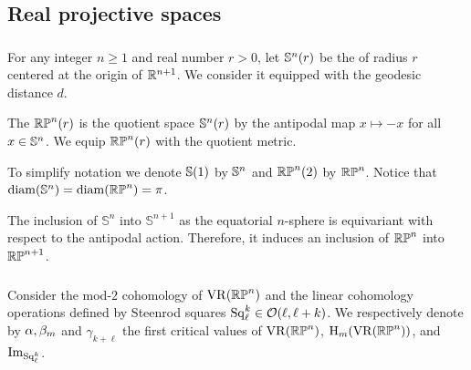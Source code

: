 
\subsection{Real projective spaces} \label{sub:first_critical_value_rpn}

\subsubsection{}

For any integer $n \geq 1$ and real number $r > 0$, let $\mathbb{S}^n(r)$ be the  of radius $r$ centered at the origin of $\mathbb{R}^{n+1}$.
We consider it equipped with the geodesic distance $d$.

The  $\mathbb{RP}^n(r)$ is the quotient space $\mathbb{S}^n(r)$ by the antipodal map $x \mapsto -x$ for all $x \in \mathbb{S}^n$.
We equip $\mathbb{RP}^n(r)$ with the quotient metric.

To simplify notation we denote $\mathbb{S}(1)$ by $\mathbb{S}^n$ and $\mathbb{RP}^n(2)$ by $\mathbb{RP}^n$.
Notice that $\operatorname{diam}(\mathbb{S}^n) = \operatorname{diam}(\mathbb{RP}^n) = \pi$.

The inclusion of \(\mathbb{S}^n\) into \(\mathbb{S}^{n+1}\) as the equatorial $n$-sphere is equivariant with respect to the antipodal action.
Therefore, it induces an inclusion of \(\mathbb{RP}^n\) into \(\mathbb{RP}^{n+1}\).


\subsubsection{}\label{sub:barcode_rpn}

Consider the mod-\(2\) cohomology of \(\operatorname{VR}(\mathbb{RP}^n)\) and the linear cohomology operations defined by Steenrod squares \(\operatorname{Sq}^k_\ell \in \mathcal{O}(\ell,\ell+k)\).
We respectively denote by $\alpha, \beta_m$ and $\gamma_{k + \ell}$ the first critical values of \(\operatorname{VR}(\mathbb{RP}^n)\), \(\mathrm{H}_m(\operatorname{VR}(\mathbb{RP}^n))\), and \(\operatorname{Im}_{\operatorname{Sq}^k_\ell}\).


